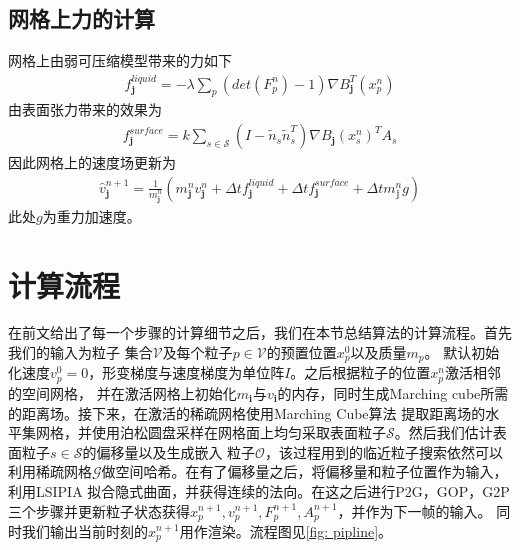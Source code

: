 \subsection{网格上力的计算}
网格上由弱可压缩模型带来的力如下
\begin{align}
    f^{liquid}_{\mathbf{j}} = -\lambda \sum_p (det(F_p^n) - 1)\nabla B_{\mathbf{j}}^T(x_p^n)
\end{align}
由表面张力带来的效果为
\begin{align}
    f^{surface}_{\mathbf{j}} = k \sum_{s\in\mathcal{S}}(I - \tilde{n}_s\tilde{n}_s^T)\nabla B_{\mathbf{j}}(x_s^n)^TA_s
\end{align}
因此网格上的速度场更新为
\begin{align}
    \hat{v}_{\mathbf{j}}^{n+1} = \frac{1}{m_\mathbf{j}^n}(m_{\mathbf{j}}^nv_{\mathbf{j}}^n + \Delta t f^{liquid}_{\mathbf{j}} + \Delta t f^{surface}_{\mathbf{j}} +\Delta t m_\mathbb{j}^n g)
\end{align}
此处$g$为重力加速度。
\section{计算流程}
在前文给出了每一个步骤的计算细节之后，我们在本节总结算法的计算流程。首先我们的输入为粒子
集合$\mathcal{V}$及每个粒子$p\in\mathcal{V}$的预置位置$x_p^0$以及质量$m_p$。
默认初始化速度$v_p^0 = 0$，形变梯度与速度梯度为单位阵$I$。之后根据粒子的位置$x_p^n$激活相邻的空间网格，
并在激活网格上初始化$m_\mathbf{i}$与$v_\mathbf{i}$的内存，同时生成Marching cube所需的距离场。接下来，在激活的稀疏网格使用Marching Cube算法
提取距离场的水平集网格，并使用泊松圆盘采样在网格面上均匀采取表面粒子$\mathcal{S}$。然后我们估计表面粒子$s\in \mathcal{S}$的偏移量以及生成嵌入
粒子$\mathcal{O}$，该过程用到的临近粒子搜索依然可以利用稀疏网格$\mathcal{G}$做空间哈希。在有了偏移量之后，将偏移量和粒子位置作为输入，利用LSIPIA
拟合隐式曲面，并获得连续的法向。在这之后进行P2G，GOP，G2P三个步骤并更新粒子状态获得$x_p^{n+1},v_p^{n+1},F_p^{n+1},A_p^{n+1}$，并作为下一帧的输入。
同时我们输出当前时刻的$x_p^{n+1}$用作渲染。流程图见\ref{fig: pipline}。

